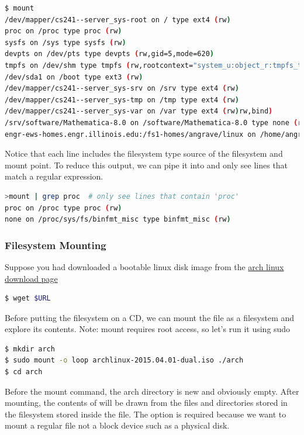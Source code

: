 \begin{lstlisting}[language=bash]
$ mount
/dev/mapper/cs241--server_sys-root on / type ext4 (rw)
proc on /proc type proc (rw)
sysfs on /sys type sysfs (rw)
devpts on /dev/pts type devpts (rw,gid=5,mode=620)
tmpfs on /dev/shm type tmpfs (rw,rootcontext="system_u:object_r:tmpfs_t:s0")
/dev/sda1 on /boot type ext3 (rw)
/dev/mapper/cs241--server_sys-srv on /srv type ext4 (rw)
/dev/mapper/cs241--server_sys-tmp on /tmp type ext4 (rw)
/dev/mapper/cs241--server_sys-var on /var type ext4 (rw)rw,bind)
/srv/software/Mathematica-8.0 on /software/Mathematica-8.0 type none (rw,bind)
engr-ews-homes.engr.illinois.edu:/fs1-homes/angrave/linux on /home/angrave type nfs (rw,soft,intr,tcp,noacl,acregmin=30,vers=3,sec=sys,sloppy,addr=128.174.252.102)
\end{lstlisting}

Notice that each line includes the filesystem type source of the filesystem and mount point.
To reduce this output, we can pipe it into  and only see lines that match a regular expression.

\begin{lstlisting}[language=bash]
>mount | grep proc  # only see lines that contain 'proc'
proc on /proc type proc (rw)
none on /proc/sys/fs/binfmt_misc type binfmt_misc (rw)
\end{lstlisting}

\subsubsection{Filesystem Mounting}

Suppose you had downloaded a bootable linux disk image from the \href{https://www.archlinux.org/download/}{arch linux download page}

\begin{lstlisting}[language=bash]
$ wget $URL
\end{lstlisting}

Before putting the filesystem on a CD, we can mount the file as a filesystem and explore its contents.
Note: mount requires root access, so let's run it using sudo

\begin{lstlisting}[language=bash]
$ mkdir arch
$ sudo mount -o loop archlinux-2015.04.01-dual.iso ./arch
$ cd arch
\end{lstlisting}

Before the mount command, the arch directory is new and obviously empty.
After mounting, the contents of  will be drawn from the files and directories stored in the filesystem stored inside the  file.
The  option is required because we want to mount a regular file not a block device such as a physical disk.

